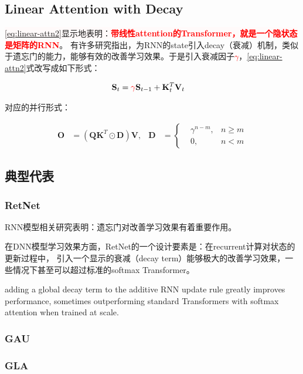 \subsection{Linear Attention with Decay}

\colorbox{snow}{\eqref{eq:linear-attn2}显示地表明：\textcolor{red}{\textbf{带线性attention的Transformer，就是一个隐状态是矩阵的RNN}}}。
有许多研究指出，为RNN的state引入decay（衰减）机制，类似于遗忘门的能力，能够有效的改善学习效果。于是引入衰减因子\textcolor{red}{$\gamma$}，\eqref{eq:linear-attn2}式改写成如下形式：

\begin{align}
\mathbf{S}_t &= \textcolor{red}{\gamma} \mathbf{S}_{t-1} + \mathbf{K}_t^{T}\mathbf{V}_t
\end{align}

对应的并行形式：

\begin{align*}
\mathbf{O} &= \left( \mathbf{Q}\mathbf{K}^T \odot \mathbf{D}\right)\mathbf{V},
&\mathbf{D} &= \left\{
\begin{aligned}
  &\gamma^{n-m}, &n \ge m \\
  &0, &n < m
\end{aligned}
\right.
\end{align*}

\subsection{典型代表}

\subsubsection{RetNet\cite{sun2023retentive}}

RNN模型相关研究表明：遗忘门对改善学习效果有着重要作用。

在DNN模型学习效果方面，RetNet的一个设计要素是：在recurrent计算对状态的更新过程中，
引入一个显示的衰减（decay term）能够极大的改善学习效果，一些情况下甚至可以超过标准的softmax Transformer。

\begin{displayquote}
adding a global decay term to the additive RNN update rule greatly improves performance, sometimes outperforming standard Transformers with softmax attention when trained at scale.\cite{yang2023gated}
\end{displayquote}

\subsubsection{GAU\cite{hua2022transformer}}

\subsubsection{GLA\cite{yang2023gated}}
